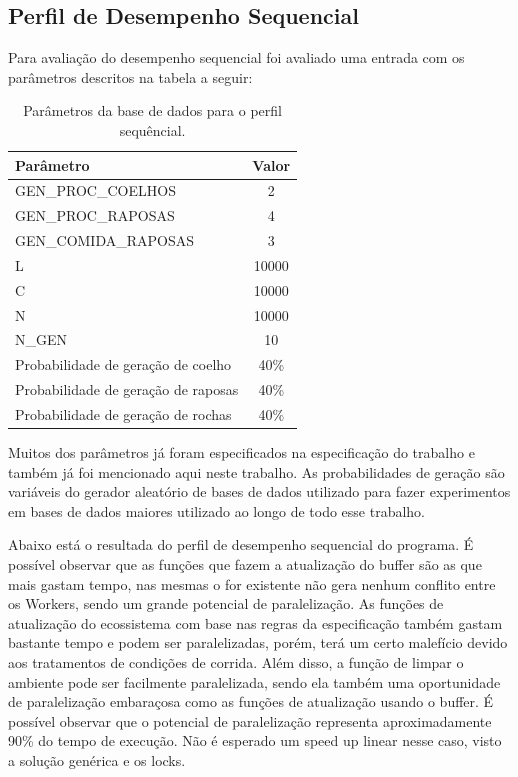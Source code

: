 \documentclass[12pt]{article}
\begin{document}
\subsection{Perfil de Desempenho Sequencial}

Para avaliação do desempenho sequencial foi avaliado uma entrada com os parâmetros descritos na tabela a seguir:


\begin{table}[H]
	\begin{center}
		\begin{tabular}{|l|c|}
			\hline
			Parâmetro                           & Valor \\
			\hline
			GEN\_PROC\_COELHOS                  & 2     \\
			GEN\_PROC\_RAPOSAS                  & 4     \\
			GEN\_COMIDA\_RAPOSAS                & 3     \\
			L                                   & 10000 \\
			C                                   & 10000 \\
			N                                   & 10000 \\
			N\_GEN                              & 10    \\\hline
			Probabilidade de geração de coelho  & 40\%  \\
			Probabilidade de geração de raposas & 40\%  \\
			Probabilidade de geração de rochas  & 40\%  \\
			\hline
		\end{tabular}
	\end{center}
	\caption{Parâmetros da base de dados para o perfil sequêncial.}
	\label{tab:parametros_base_de_dados_perfil_sequencial}
\end{table}

Muitos dos parâmetros já foram especificados na especificação do trabalho e também já foi mencionado aqui neste trabalho. As probabilidades de geração são variáveis do gerador aleatório de bases de dados utilizado para fazer experimentos em bases de dados maiores utilizado ao longo de todo esse trabalho.


Abaixo está o resultada do perfil de desempenho sequencial do programa. É possível observar que as funções que fazem a atualização do buffer são as que mais gastam tempo, nas mesmas o for existente não gera nenhum conflito entre os Workers, sendo um grande potencial de paralelização. As funções de atualização do ecossistema com base nas regras da especificação também gastam bastante tempo e podem ser paralelizadas, porém, terá um certo malefício devido aos tratamentos de condições de corrida. Além disso, a função de limpar o ambiente pode ser facilmente paralelizada, sendo ela também uma oportunidade de paralelização embaraçosa como as funções de atualização usando o buffer. É possível observar que o potencial de paralelização representa aproximadamente 90\% do tempo de execução. Não é esperado um speed up linear nesse caso, visto a solução genérica e os locks.
\end{document}
